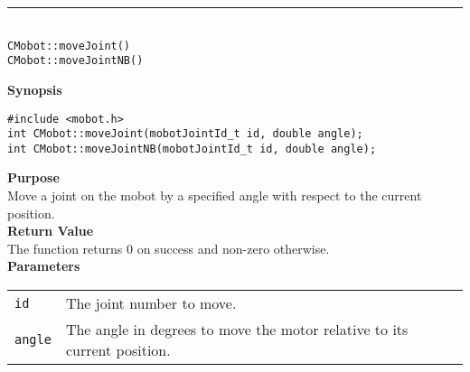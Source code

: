 \noindent
\vspace{5pt}
\rule{4.5in}{0.015in}\\
\noindent
{\LARGE \texttt{CMobot::moveJoint()}}\\
{\LARGE \texttt{CMobot::moveJointNB()}}\\
{}

\noindent
{\bf Synopsis}
\vspace{-8pt}
\begin{verbatim}
#include <mobot.h>
int CMobot::moveJoint(mobotJointId_t id, double angle);
int CMobot::moveJointNB(mobotJointId_t id, double angle);
\end{verbatim}

\noindent
{\bf Purpose}\\
Move a joint on the mobot by a specified angle with respect to the current position.\\

\noindent
{\bf Return Value}\\
The function returns 0 on success and non-zero otherwise.\\

\noindent
{\bf Parameters}\\
\vspace{-0.1in}
\begin{description}
\item               
\begin{tabular}{p{10 mm}p{145 mm}}
\texttt{id} & The joint number to move. \\
\texttt{angle} & The angle in degrees to move the motor relative to its current position.  \\
\end{tabular}
\end{description}


